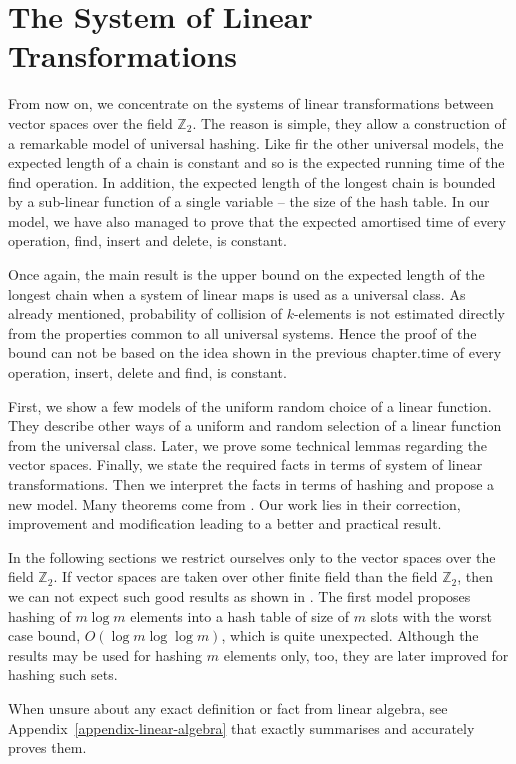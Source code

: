 \chapter{The System of Linear Transformations}
\label{chapter-linear-systems}
From now on, we concentrate on the systems of linear transformations between vector spaces over the field $\mathbb{Z}_2$. The reason is simple, they allow a construction of a remarkable model of universal hashing. Like fir the other universal models, the expected length of a chain is constant and so is the expected running time of the find operation. In addition, the expected length of the longest chain is bounded by a sub-linear function of a single variable -- the size of the hash table. In our model, we have also managed to prove that the expected amortised time of every operation, find, insert and delete, is constant.

Once again, the main result is the upper bound on the expected length of the longest chain when a system of linear maps is used as a universal class. As already mentioned, probability of collision of $k$-elements is not estimated directly from the properties common to all universal systems. Hence the proof of the bound can not be based on the idea shown in the previous chapter.time of every operation, insert, delete and find, is constant.

First, we show a few models of the uniform random choice of a linear function. They describe other ways of a uniform and random selection of a linear function from the universal class. Later, we prove some technical lemmas regarding the vector spaces. Finally, we state the required facts in terms of system of linear transformations. Then we interpret the facts in terms of hashing and propose a new model. Many theorems come from \cite{DBLP:journals/jacm/AlonDMPT99}. Our work lies in their correction, improvement and modification leading to a better and practical result.

In the following sections we restrict ourselves only to the vector spaces over the field $\mathbb{Z}_2$. If vector spaces are taken over other finite field than the field $\mathbb{Z}_2$, then we can not expect such good results as shown in \cite{DBLP:journals/jacm/AlonDMPT99}. The first model proposes hashing of $m \log m$ elements into a hash table of size of $m$ slots with the worst case bound, $O(\log m \log \log m)$, which is quite unexpected. Although the results may be used for hashing $m$ elements only, too, they are later improved for hashing such sets. 

When unsure about any exact definition or fact from linear algebra, see Appendix~\ref{appendix-linear-algebra} that exactly summarises and accurately proves them.






